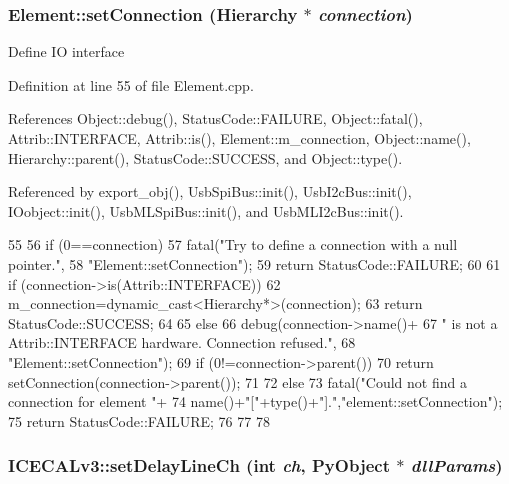 \hypertarget{classElement_ab476b4b1df5954141ceb14f072433b89}{
\subsubsection[{setConnection}]{ Element::setConnection ({\bf Hierarchy} $\ast$ {\em connection})}}
\label{classElement_ab476b4b1df5954141ceb14f072433b89}
Define IO interface 

Definition at line 55 of file Element.cpp.

References Object::debug(), StatusCode::FAILURE, Object::fatal(), Attrib::INTERFACE, Attrib::is(), Element::m\_\-connection, Object::name(), Hierarchy::parent(), StatusCode::SUCCESS, and Object::type().

Referenced by export\_\-obj(), UsbSpiBus::init(), UsbI2cBus::init(), IOobject::init(), UsbMLSpiBus::init(), and UsbMLI2cBus::init().


\begin{DoxyCode}
55                                                       {
56   if (0==connection){
57     fatal("Try to define a connection with a null pointer.",
58         "Element::setConnection");
59     return StatusCode::FAILURE;
60   }
61   if (connection->is(Attrib::INTERFACE)){
62     m_connection=dynamic_cast<Hierarchy*>(connection);
63     return StatusCode::SUCCESS;
64   }
65   else {
66     debug(connection->name()+
67         " is not a Attrib::INTERFACE hardware. Connection refused.",
68         "Element::setConnection");
69     if (0!=connection->parent()){
70       return setConnection(connection->parent());
71     }
72     else{
73       fatal("Could not find a connection for element "+
74           name()+"["+type()+"].","element::setConnection");
75       return StatusCode::FAILURE;
76     }
77   }
78 }
\end{DoxyCode}
\hypertarget{classICECALv3_a14a7a29c9a3412c062f053cc616b860a}{
\subsubsection[{setDelayLineCh}]{ ICECALv3::setDelayLineCh (int {\em ch}, \/  PyObject $\ast$ {\em dllParams})}}
\label{classICECALv3_a14a7a29c9a3412c062f053cc616b860a}


